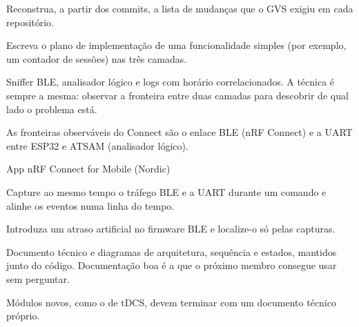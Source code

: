 \begin{pratique}
  \item Reconstrua, a partir dos commits, a lista de mudanças que o GVS exigiu em cada repositório.
  \item Escreva o plano de implementação de uma funcionalidade simples (por exemplo, um contador de sessões) nas três camadas.
\end{pratique}

Sniffer BLE, analisador lógico e logs com horário correlacionados. A técnica é sempre a mesma: observar a fronteira entre duas camadas para descobrir de qual lado o problema está.

\begin{noproduto}
As fronteiras observáveis do Connect são o enlace BLE (nRF Connect) e a UART entre ESP32 e ATSAM (analisador lógico).
\end{noproduto}

\begin{paraestudar}
  \item {}
  \item {}
  \item App nRF Connect for Mobile (Nordic)
\end{paraestudar}

\begin{pratique}
  \item Capture ao mesmo tempo o tráfego BLE e a UART durante um comando e alinhe os eventos numa linha do tempo.
  \item Introduza um atraso artificial no firmware BLE e localize-o só pelas capturas.
\end{pratique}

Documento técnico e diagramas de arquitetura, sequência e estados, mantidos junto do código. Documentação boa é a que o próximo membro consegue usar sem perguntar.

\begin{noproduto}
Módulos novos, como o de tDCS, devem terminar com um documento técnico próprio.
\end{noproduto}

\begin{paraestudar}
  \item {}
  \item {}
\end{paraestudar}

